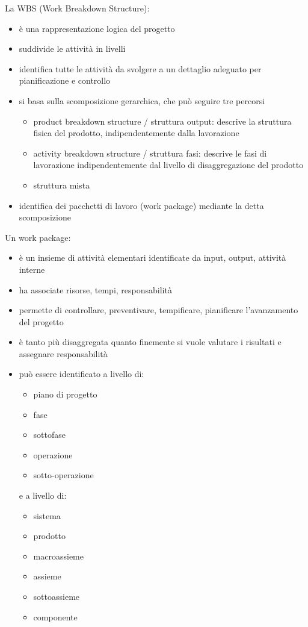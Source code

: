 \documentclass[answers, a4paper, 11pt]{exam}
\begin{document}
La WBS (Work Breakdown Structure):

\begin{itemize}
    \item è una rappresentazione logica del progetto
    \item suddivide le attività in livelli
    \item identifica tutte le attività da svolgere a un dettaglio adeguato per pianificazione e controllo
    \item si basa sulla scomposizione gerarchica, che può seguire tre percorsi
    \begin{itemize}
        \item product breakdown structure / struttura output: descrive la struttura fisica del prodotto, indipendentemente dalla lavorazione
        \item activity breakdown structure / struttura fasi: descrive le fasi di lavorazione indipendentemente dal livello di disaggregazione del prodotto
        \item struttura mista
    \end{itemize}
    \item identifica dei pacchetti di lavoro (work package) mediante la detta scomposizione
\end{itemize}

Un work package:

\begin{itemize}
    \item è un insieme di attività elementari identificate da input, output, attività interne
    \item ha associate risorse, tempi, responsabilità
    \item permette di controllare, preventivare, tempificare, pianificare l'avanzamento del progetto
    \item è tanto più disaggregata quanto finemente si vuole valutare i risultati e assegnare responsabilità
    \item può essere identificato a livello di:
    \begin{itemize}
        \item piano di progetto
        \item fase
        \item sottofase
        \item operazione
        \item sotto-operazione
    \end{itemize}
    e a livello di:
    \begin{itemize}
        \item sistema
        \item prodotto
        \item macroassieme
        \item assieme
        \item sottoassieme
        \item componente
    \end{itemize}
\end{itemize}
\end{document}
